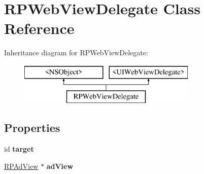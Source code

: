 \hypertarget{interface_r_p_web_view_delegate}{\section{R\-P\-Web\-View\-Delegate Class Reference}
\label{interface_r_p_web_view_delegate}
}
Inheritance diagram for R\-P\-Web\-View\-Delegate\-:\begin{figure}[H]
\begin{center}
\leavevmode
\includegraphics[height=2.000000cm]{interface_r_p_web_view_delegate}
\end{center}
\end{figure}
\subsection*{Properties}
\begin{DoxyCompactItemize}
\item 
\hypertarget{interface_r_p_web_view_delegate_a4f8000d5fe96938c0afafcd8726013c4}{id {\bfseries target}}\label{interface_r_p_web_view_delegate_a4f8000d5fe96938c0afafcd8726013c4}

\item 
\hypertarget{interface_r_p_web_view_delegate_ad3891822de68f4ab44abfa4ce1a4e1a4}{\hyperlink{interface_r_p_ad_view}{R\-P\-Ad\-View} $\ast$ {\bfseries ad\-View}}\label{interface_r_p_web_view_delegate_ad3891822de68f4ab44abfa4ce1a4e1a4}

\end{DoxyCompactItemize}
